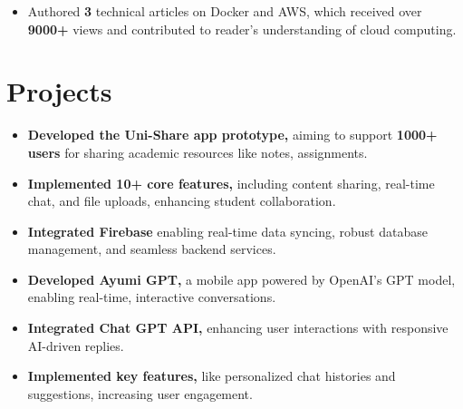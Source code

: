\documentclass[]{deedy-resume-openfont}
\begin{document}
\begin{minipage}[t]{0.66\textwidth}
\vspace{\topsep}
\begin{itemize}[leftmargin=*]
    \item Authored \textbf{3} technical articles on Docker and AWS, which received over \textbf{9000+} views and contributed to reader's understanding of cloud computing.
\end{itemize}

\sectionsep

\section{Projects}
\begin{itemize}[leftmargin=*]
    \item \textbf{Developed the Uni-Share app prototype,} aiming to support \textbf {1000+ users} for sharing academic resources like notes, assignments.
    \vspace{-2.3mm} %
    \item \textbf{Implemented 10+ core features,} including content sharing, real-time chat, and file uploads, enhancing student collaboration.
    \vspace{-2.3mm}
    \item \textbf{Integrated Firebase} enabling real-time data syncing, robust database management, and seamless backend services.
\end{itemize}
\sectionsep

\begin{itemize}[leftmargin=*]
    \item \textbf{Developed Ayumi GPT,} a mobile app powered by OpenAI’s GPT model, enabling real-time, interactive conversations.
    \vspace{-2.4mm} %
    \item \textbf{Integrated Chat GPT API,} enhancing user interactions with responsive AI-driven replies.
    \vspace{-2.4mm}
    \item \textbf{Implemented key features,} like personalized chat histories and suggestions, increasing user engagement.
\end{itemize}
\sectionsep

\end{minipage} 
\end{document}
